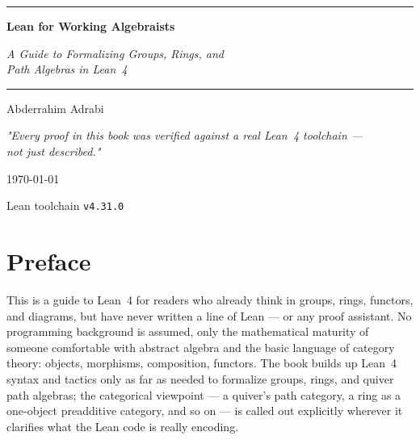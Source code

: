 \begin{titlepage}
\centering
\vspace*{2cm}

{\color{ruleblue}\rule{0.6\textwidth}{1.2pt}}\par
\vspace{0.6cm}

{\normalfont\Huge\bfseries Lean for Working Algebraists\par}
\vspace{0.5cm}
{\normalfont\Large\itshape A Guide to Formalizing Groups, Rings, and\\[2pt]
Path Algebras in Lean~4\par}

\vspace{0.6cm}
{\color{ruleblue}\rule{0.6\textwidth}{1.2pt}}\par

\vspace{2.5cm}
{\normalfont\Large Abderrahim Adrabi\par}

\vfill

{\normalfont\large\itshape "Every proof in this book was verified against
a real Lean~4 toolchain --- \\
not just described."\par}

\vspace{1.5cm}
{\normalfont\normalsize \today\par}
{\normalfont\small Lean toolchain \texttt{v4.31.0}\par}

\end{titlepage}

\chapter*{Preface}

This is a guide to Lean~4 for readers who already think in groups, rings,
functors, and diagrams, but have never written a line of Lean --- or any
proof assistant. No programming background is assumed, only the
mathematical maturity of someone comfortable with abstract algebra and the
basic language of category theory: objects, morphisms, composition,
functors. The book builds up Lean~4 syntax and tactics only as far as
needed to formalize groups, rings, and quiver path algebras; the
categorical viewpoint --- a quiver's path category, a ring as a one-object
preadditive category, and so on --- is called out explicitly wherever it
clarifies what the Lean code is really encoding.

